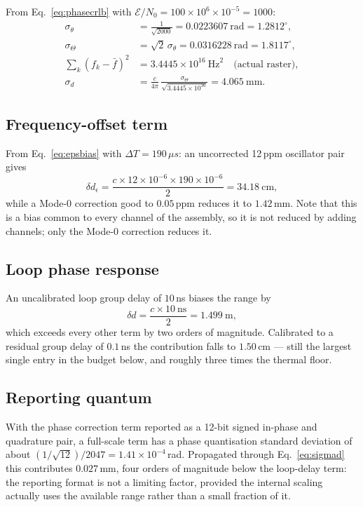 \documentclass[11pt,a4paper]{article}
\newcommand{\us}{\,\ensuremath{\upmu}s}
\providecommand{\upmu}{\mu}
\begin{document}
From Eq.~\eqref{eq:phasecrlb} with $\mathcal{E}/N_0 = 100 \times 10^{6} \times 10^{-5} = 1000$:
\begin{align}
\sigma_\theta &= \frac{1}{\sqrt{2000}} = 0.0223607\ \text{rad} = 1.2812^{\circ}, \\
\sigma_\Theta &= \sqrt2\,\sigma_\theta = 0.0316228\ \text{rad} = 1.8117^{\circ}, \\
\textstyle\sum_k (f_k-\bar f)^2 &= 3.4445\times10^{16}\ \text{Hz}^2 \quad\text{(actual raster)}, \\
\sigma_d &= \frac{c}{4\pi}\,\frac{\sigma_\Theta}{\sqrt{3.4445\times10^{16}}} = 4.065\ \text{mm}.
\end{align}

\subsection{Frequency-offset term}

From Eq.~\eqref{eq:epsbias} with $\Delta T = 190\us$: an uncorrected 12\,ppm oscillator pair gives
\begin{equation}
\delta d_\epsilon = \frac{c \times 12\times10^{-6} \times 190\times10^{-6}}{2} = 34.18\ \text{cm},
\end{equation}
while a Mode-0 correction good to $0.05$\,ppm reduces it to $1.42$\,mm. Note that this is a bias
common to every channel of the assembly, so it is not reduced by adding channels; only the Mode-0
correction reduces it.

\subsection{Loop phase response}

An uncalibrated loop group delay of $10$\,ns biases the range by
\begin{equation}
\delta d = \frac{c \times 10\ \text{ns}}{2} = 1.499\ \text{m},
\end{equation}
which exceeds every other term by two orders of magnitude. Calibrated to a residual group delay of
$0.1$\,ns the contribution falls to $1.50$\,cm --- still the largest single entry in the budget
below, and roughly three times the thermal floor.

\subsection{Reporting quantum}

With the phase correction term reported as a 12-bit signed in-phase and quadrature pair, a
full-scale term has a phase quantisation standard deviation of about
$(1/\sqrt{12})/2047 = 1.41\times10^{-4}$\,rad. Propagated through Eq.~\eqref{eq:sigmad} this
contributes $0.027$\,mm, four orders of magnitude below the loop-delay term: the reporting format is
not a limiting factor, provided the internal scaling actually uses the available range rather than a
small fraction of it.
\end{document}
